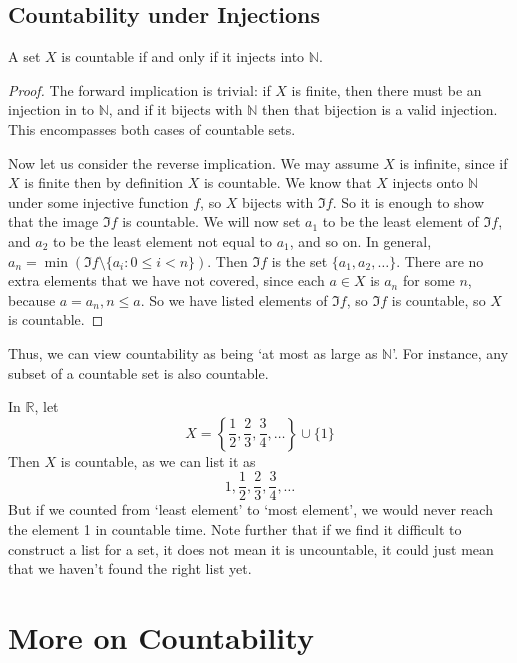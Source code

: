 \documentclass{article}
\begin{document}
	\subsection{Countability under Injections}
	\begin{proposition}
		A set $X$ is countable if and only if it injects into $\mathbb N$.
	\end{proposition}
	\begin{proof}
		The forward implication is trivial: if $X$ is finite, then there must be an injection in to $\mathbb N$, and if it bijects with $\mathbb N$ then that bijection is a valid injection. This encompasses both cases of countable sets.

		Now let us consider the reverse implication. We may assume $X$ is infinite, since if $X$ is finite then by definition $X$ is countable. We know that $X$ injects onto $\mathbb N$ under some injective function $f$, so $X$ bijects with $\Im f$. So it is enough to show that the image $\Im f$ is countable. We will now set $a_1$ to be the least element of $\Im f$, and $a_2$ to be the least element not equal to $a_1$, and so on. In general, $a_n = \min (\Im f \setminus \{ a_i : 0 \leq i < n \})$. Then $\Im f$ is the set $\{ a_1, a_2, \dots \}$. There are no extra elements that we have not covered, since each $a \in X$ is $a_n$ for some $n$, because $a=a_n, n \leq a$. So we have listed elements of $\Im f$, so $\Im f$ is countable, so $X$ is countable.
	\end{proof}
	Thus, we can view countability as being `at most as large as $\mathbb N$'. For instance, any subset of a countable set is also countable.

	\begin{remark}
		In $\mathbb R$, let
		\[ X = \left\{ \frac{1}{2}, \frac{2}{3}, \frac{3}{4}, \dots \right\} \cup \{ 1 \} \]
		Then $X$ is countable, as we can list it as
		\[ 1, \frac{1}{2}, \frac{2}{3}, \frac{3}{4}, \dots \]
		But if we counted from `least element' to `most element', we would never reach the element 1 in countable time. Note further that if we find it difficult to construct a list for a set, it does not mean it is uncountable, it could just mean that we haven't found the right list yet.
	\end{remark}

	\section{More on Countability}
\end{document}
